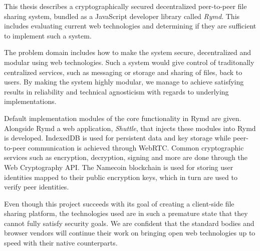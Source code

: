 %

This thesis describes a cryptographically secured decentralized peer-to-peer file sharing system, bundled as a JavaScript developer library called \emph{Rymd}. This includes evaluating current web technologies and determining if they are sufficient to implement such a system.

The problem domain includes how to make the system secure, decentralized and modular using web technologies. Such a system would give control of traditonally centralized services, such as messaging or storage and sharing of files, back to users. By making the system highly modular, we manage to achieve satisfying results in reliability and technical agnosticism with regards to underlying implementations.

Default implementation modules of the core functionality in Rymd are given. Alongside Rymd a web application, \emph{Shuttle}, that injects these modules into Rymd is developed. IndexedDB is used for persistent data and key storage while peer-to-peer communication is achieved through WebRTC. Common cryptographic services such as encryption, decryption, signing and more are done through the Web Cryptography API. The Namecoin blockchain is used for storing user identities mapped to their public encryption keys, which in turn are used to verify peer identities.

Even though this project succeeds with its goal of creating a client-side file sharing platform, the technologies used are in such a premature state that they cannot fully satisfy security goals. We are confident that the standard bodies and browser vendors will continue their work on bringing open web technologies up to speed with their native counterparts.
